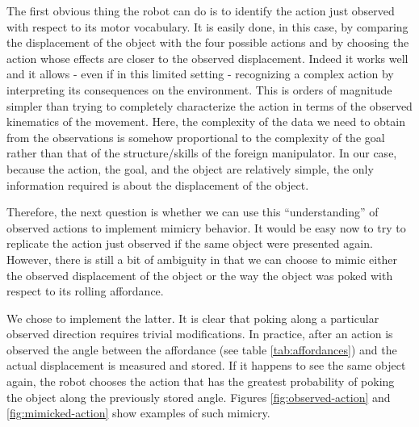 The first obvious thing the robot can do is to identify the action just observed 
with respect to its motor vocabulary. It is easily done, in this case, by comparing 
the displacement of the object with the four possible actions and by choosing the
action whose effects are closer to the observed displacement.
Indeed it works well and it allows - even if in this limited setting - recognizing 
a complex action by interpreting its consequences on the environment.
This is orders of magnitude simpler than trying to completely characterize the
action in terms of the observed kinematics of the movement. Here, the complexity
of the data we need to obtain from the observations is somehow proportional to the complexity
of the goal rather than that of the structure/skills of the foreign manipulator. In our case, because 
the action, the goal, and the object are relatively simple, the only information 
required is about the displacement of the object. 

Therefore, the next question is whether we can use this ``understanding'' of 
observed actions to implement mimicry behavior. It 
would be easy now to try to replicate the action just observed if the same
object were presented again. However, there is still a bit of ambiguity in that
we can choose to mimic either the observed displacement of the object or 
the way the object was poked with respect to its rolling affordance.
 
We chose to implement the latter. It is clear that poking along a particular 
observed direction requires trivial modifications. In practice, after an 
action is observed the angle between the affordance (see table \ref{tab:affordances}) and
the actual displacement is measured and stored. If it happens to see the same 
object again, the robot chooses the action that has the greatest 
probability of poking the object along the previously stored angle. 
Figures \ref{fig:observed-action} and \ref{fig:mimicked-action} show examples of such mimicry.

